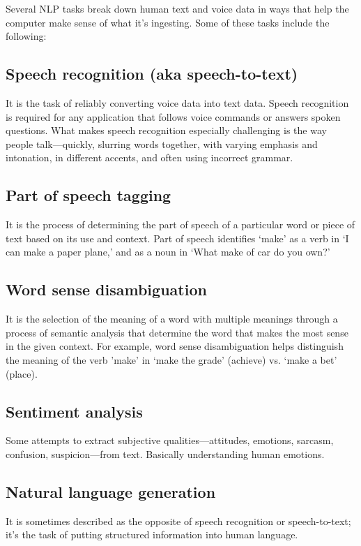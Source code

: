 \documentclass[11pt]{article}
\begin{document}
Several NLP tasks break down human text and voice data in ways that help the computer
make sense of what it's ingesting. Some of these tasks include the following:

\subsection{Speech recognition (aka speech-to-text)}
\label{sec:org3955af1}
It is the task of reliably converting voice data into text data.
Speech recognition is required for any application that follows voice commands or
answers spoken questions. What makes speech recognition especially challenging is
the way people talk—quickly, slurring words together, with varying emphasis and
intonation, in different accents, and often using incorrect grammar.

\subsection{Part of speech tagging}
\label{sec:org0accf25}
It is the process of determining the part of speech of a particular word or
piece of text based on its use and context. Part of speech identifies ‘make’ as a
verb in ‘I can make a paper plane,’ and as a noun in ‘What make of car do you own?’

\subsection{Word sense disambiguation}
\label{sec:org8edfcda}
It is the selection of the meaning of a word with multiple meanings through a process
of semantic analysis that determine the word that makes the most sense in the given
context. For example, word sense disambiguation helps distinguish the meaning of the
verb 'make' in ‘make the grade’ (achieve) vs. ‘make a bet’ (place).

\subsection{Sentiment analysis}
\label{sec:org59e6bd6}
Some attempts to extract subjective qualities—attitudes, emotions, sarcasm, confusion,
suspicion—from text. Basically understanding human emotions.

\subsection{Natural language generation}
\label{sec:org8cacc8f}
It is sometimes described as the opposite of speech recognition or speech-to-text;
it's the task of putting structured information into human language. 
\end{document}
